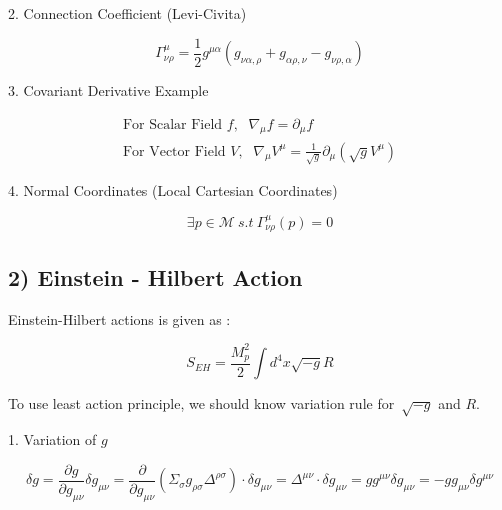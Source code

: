 \documentclass[10pt]{article}
\begin{document}
2. Connection Coefficient (Levi-Civita)

\begin{equation}
\Gamma^\mu_{\nu\rho} = \frac{1}{2}g^{\mu\alpha}(g_{\nu\alpha,\rho}+g_{\alpha\rho,\nu}-g_{\nu\rho,\alpha})
\end{equation}

3. Covariant Derivative Example

\begin{equation}
\begin{gathered}
\text{For Scalar Field $f$,    }~~\nabla_\mu f = \partial_\mu f \\
\text{For Vector Field $V$,  }~~\nabla_\mu V^\mu  = \frac{1}{\sqrt{g}}\partial_\mu (\sqrt{g}V^\mu)
\end{gathered}
\end{equation}

4. Normal Coordinates (Local Cartesian Coordinates)

\begin{equation}
\exists p \in \mathcal{M}~s.t~\Gamma^{\mu}_{\nu\rho}(p) = 0
\end{equation}

\par\null\par\null

\subsection*{2) Einstein - Hilbert
Action}

{\label{657537}}\par\null

Einstein-Hilbert actions is given as :

\begin{equation}
S_{EH} = \frac{M_p^2}{2}\int d^4x\sqrt{-g}R
\end{equation}

To use least action principle, we should know variation rule
for~\(\sqrt{-g}\) and \(R\).

\par\null

1. Variation of \(g\)

\begin{equation}
\delta g = \frac{\partial g}{\partial g_{\mu\nu}}\delta g_{\mu\nu} = \frac{\partial}{\partial g_{\mu\nu}}\left(\Sigma_\sigma g_{\rho\sigma}\Delta^{\rho\sigma}\right) \cdot \delta g_{\mu\nu} = \Delta^{\mu\nu}\cdot\delta g_{\mu\nu} = gg^{\mu\nu}\delta g_{\mu\nu}= - gg_{\mu\nu}\delta g^{\mu\nu}
\end{equation}
\end{document}
